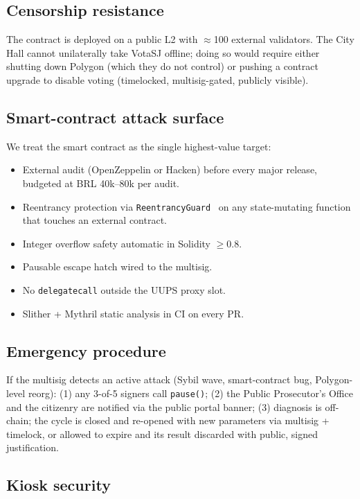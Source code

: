 \documentclass[12pt]{article}
\begin{document}
\subsection{Censorship resistance}

The contract is deployed on a public L2 with \(\approx\)100 external
validators. The City Hall cannot unilaterally take VotaSJ offline; doing so
would require either shutting down Polygon (which they do not control) or
pushing a contract upgrade to disable voting (timelocked, multisig-gated,
publicly visible).

\subsection{Smart-contract attack surface}

We treat the smart contract as the single highest-value target:

\begin{itemize}
  \item External audit (OpenZeppelin or Hacken) before every major release,
        budgeted at BRL 40k--80k per audit.
  \item Reentrancy protection via \texttt{ReentrancyGuard}~\cite{openzeppelin5}
        on any state-mutating function that touches an external contract.
  \item Integer overflow safety automatic in Solidity \(\geq\)0.8.
  \item Pausable escape hatch wired to the multisig.
  \item No \texttt{delegatecall} outside the UUPS proxy slot.
  \item Slither + Mythril static analysis in CI on every PR.
\end{itemize}

\subsection{Emergency procedure}

If the multisig detects an active attack (Sybil wave, smart-contract bug,
Polygon-level reorg): (1) any 3-of-5 signers call \texttt{pause()}; (2) the
Public Prosecutor's Office and the citizenry are notified via the public
portal banner; (3) diagnosis is off-chain; the cycle is closed and re-opened
with new parameters via multisig + timelock, or allowed to expire and its
result discarded with public, signed justification.

\subsection{Kiosk security}
\label{sec:kiosk-security}
\end{document}
